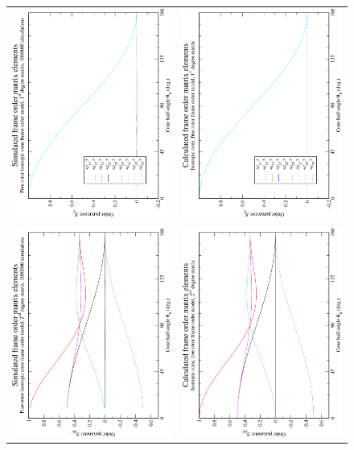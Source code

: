 \begin{figure}
\centering
  \begin{tabular}{@{}cc@{}}
    \includegraphics[width=.35\textwidth,angle=270]{images/frame_order_matrix/Sij_iso_cone_free_rotor_in_frame_theta_x_ens1000000.eps} &
    \includegraphics[width=.35\textwidth,angle=270]{images/frame_order_matrix/Sij_iso_cone_free_rotor_in_frame_theta_x_calc.eps} \\
    \\[-5pt]
    \includegraphics[width=.35\textwidth,angle=270]{images/frame_order_matrix/Sijkl_iso_cone_free_rotor_in_frame_theta_x_ens1000000.eps} &
    \includegraphics[width=.35\textwidth,angle=270]{images/frame_order_matrix/Sijkl_iso_cone_free_rotor_in_frame_theta_x_calc.eps} \\

\end{tabular}
\end{figure}
